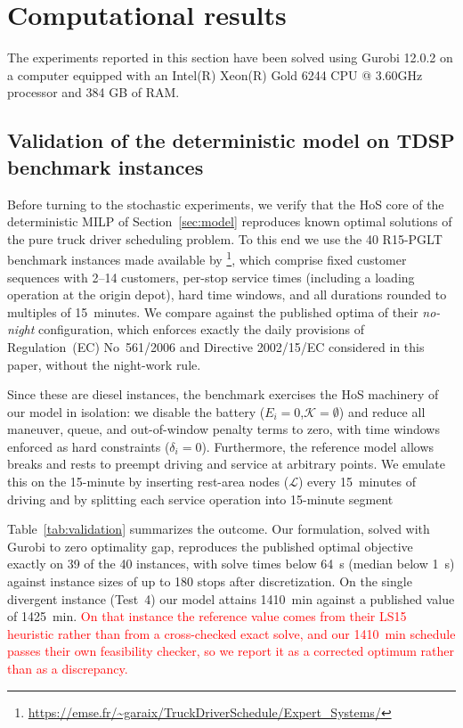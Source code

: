\documentclass[preprint,12pt,3p]{elsarticle}
\newcommand{\red}[1]{\textcolor{red}{#1}}
\begin{document}
\section{Computational results} \label{sec:results}
The experiments reported in this section have been solved using Gurobi 12.0.2 on a computer equipped with an Intel(R) Xeon(R) Gold 6244 CPU @ 3.60GHz processor and 384 GB of RAM.


\subsection{Validation of the deterministic model on TDSP benchmark instances}
\label{sec:validation}

Before turning to the stochastic experiments, we verify that the HoS core of the deterministic MILP of Section~\ref{sec:model} reproduces known optimal solutions of the pure truck driver scheduling problem. To this end we use the 40 R15-PGLT benchmark instances made available by \citet{garaix_label-setting_2024}\footnote{\url{https://emse.fr/~garaix/TruckDriverSchedule/Expert_Systems/}}, which comprise fixed customer sequences with 2--14 customers, per-stop service times (including a loading operation at the origin depot), hard time windows, and all durations rounded to multiples of 15~minutes. We compare against the published optima of their \emph{no-night} configuration, which enforces exactly the daily provisions of Regulation~(EC) No~561/2006 and Directive 2002/15/EC considered in this paper, without the night-work rule.

Since these are diesel instances, the benchmark exercises the HoS machinery of our model in isolation: we disable the battery ($E_i = 0$,$\mathcal K = \emptyset$) and reduce all maneuver, queue, and out-of-window penalty terms to zero, with time windows enforced as hard constraints ($\delta_i = 0$). Furthermore, the reference model allows breaks and rests to preempt driving and service at arbitrary points. We emulate this on the 15-minute by inserting rest-area nodes ($\mathcal L$) every 15~minutes of driving and by splitting each service operation into 15-minute segment

Table~\ref{tab:validation} summarizes the outcome. Our formulation, solved with Gurobi to zero optimality gap, reproduces the published optimal objective exactly on 39 of the 40 instances, with solve times below 64~s (median below 1~s) against instance sizes of up to 180 stops after discretization. On the single divergent instance (Test~4) our model attains 1410~min against a published value of 1425~min. \red{On that instance the reference value comes from their LS15 heuristic rather than from a cross-checked exact solve, and our 1410~min schedule passes their own feasibility checker, so we report it as a corrected optimum rather than as a discrepancy.}
\end{document}
